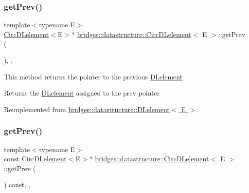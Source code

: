 \subsubsection{\texorpdfstring{get\+Prev()}{getPrev()}\hspace{0.1cm}{\footnotesize\ttfamily [1/2]}}
{\footnotesize\ttfamily template$<$typename E$>$ \\
\hyperlink{classbridges_1_1datastructure_1_1_circ_d_lelement}{Circ\+D\+Lelement}$<$E$>$$\ast$ \hyperlink{classbridges_1_1datastructure_1_1_circ_d_lelement}{bridges\+::datastructure\+::\+Circ\+D\+Lelement}$<$ E $>$\+::get\+Prev (\begin{DoxyParamCaption}{ }\end{DoxyParamCaption})\hspace{0.3cm}{\ttfamily [inline]}, {\ttfamily [override]}, {\ttfamily [virtual]}}

This method returns the pointer to the previous \hyperlink{classbridges_1_1datastructure_1_1_d_lelement}{D\+Lelement} \begin{DoxyReturn}{Returns}
the \hyperlink{classbridges_1_1datastructure_1_1_d_lelement}{D\+Lelement} assigned to the prev pointer 
\end{DoxyReturn}


Reimplemented from \hyperlink{classbridges_1_1datastructure_1_1_d_lelement_a0edfa823d0fc6f3dba58f85dbf5a11ff}{bridges\+::datastructure\+::\+D\+Lelement$<$ E $>$}.

\mbox{\label{classbridges_1_1datastructure_1_1_circ_d_lelement_a80a08e1d066b1a1f474aa9fd3bc29972}} 
\subsubsection{\texorpdfstring{get\+Prev()}{getPrev()}\hspace{0.1cm}{\footnotesize\ttfamily [2/2]}}
{\footnotesize\ttfamily template$<$typename E$>$ \\
const \hyperlink{classbridges_1_1datastructure_1_1_circ_d_lelement}{Circ\+D\+Lelement}$<$E$>$$\ast$ \hyperlink{classbridges_1_1datastructure_1_1_circ_d_lelement}{bridges\+::datastructure\+::\+Circ\+D\+Lelement}$<$ E $>$\+::get\+Prev (\begin{DoxyParamCaption}{ }\end{DoxyParamCaption}) const\hspace{0.3cm}{\ttfamily [inline]}, {\ttfamily [override]}, {\ttfamily [virtual]}}

